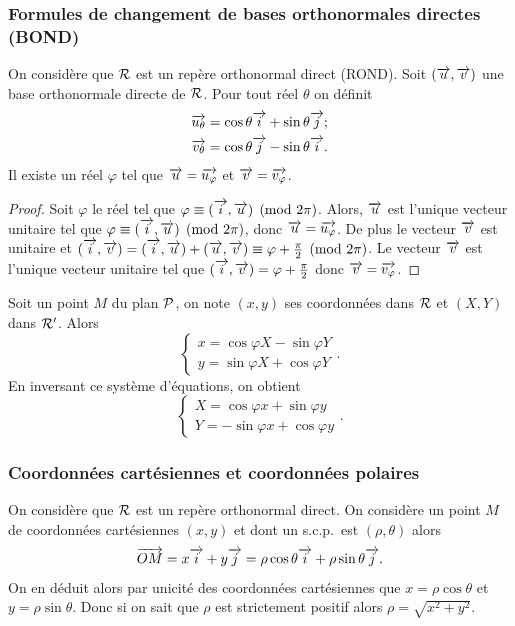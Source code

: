\subsubsection{Formules de changement de bases orthonormales directes (BOND)}
\label{subsubsec:formuledechangementdeBOND}
On considère que $\Rep$ est un repère orthonormal direct (ROND). Soit $(\vu,\vv)$ une base orthonormale directe de $\Rep$. Pour tout réel $\theta$ on définit
\begin{align}
 \vect{u_\theta}&=\cos \theta \vi + \sin \theta \vj; \\
 \vect{v_\theta}&=\cos \theta \vj -\sin \theta \vi .
\end{align}
Il existe un réel $\varphi$ tel que $\vu=\vect{u_\varphi}$ et $\vv=\vect{v_\varphi}$.
\begin{proof}
  Soit $\varphi$ le réel tel que $\congru{\varphi}{(\vi,\vu)}{2\pi}$. Alors, $\vu$ est l'unique vecteur unitaire tel que $\congru{\varphi}{(\vi,\vu)}{2\pi}$, donc $\vu=\vect{u_\varphi}$. De plus le vecteur $\vv$ est unitaire et $(\vi,\vv)=\congru{(\vi,\vu)+(\vu,\vv)}{\varphi+\frac{\pi}{2}}{2\pi}$. Le vecteur $\vv$ est l'unique vecteur unitaire tel que $(\vi,\vv)=\varphi+\frac{\pi}{2}$ donc $\vv=\vect{v_\varphi}$.
\end{proof}
Soit un point $M$ du plan $\P$, on note $(x,y)$ ses coordonnées dans $\Rep$ et $(X,Y)$ dans $\Rep'$. Alors
\begin{equation}
  \begin{cases}
    x=\cos \varphi X - \sin \varphi Y \\
    y=\sin \varphi X + \cos \varphi Y
  \end{cases}.
\end{equation}
En inversant ce système d'équations, on obtient
\begin{equation}
  \begin{cases}
    X=\cos \varphi x + \sin \varphi y\\
    Y=-\sin \varphi x + \cos \varphi y
  \end{cases}.
\end{equation}
%
\subsubsection{Coordonnées cartésiennes et coordonnées polaires}
\label{subsubsec:coordpoletcoordcart}
On considère que $\Rep$ est un repère orthonormal direct. On considère un point $M$ de coordonnées cartésiennes $(x,y)$ et dont un s.c.p.\ est $(\rho,\theta)$ alors
\begin{equation}
 \vect{OM}=x \vi+y\vj=\rho \cos \theta \vi + \rho \sin \theta \vj.
\end{equation}
On en déduit alors par unicité des coordonnées cartésiennes que $x=\rho \cos \theta$ et $y=\rho \sin \theta$. Donc si on sait que $\rho$ est strictement positif alors $\rho=\sqrt{x^2+y^2}$.
%
